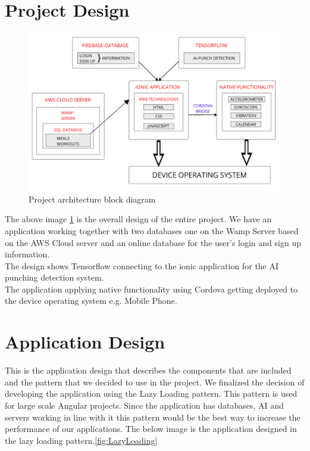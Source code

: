 \documentclass[a4paper,12pt]{report}
\begin{document}
\section{Project Design}
\begin{figure}[h]
\includegraphics[scale=.37]{images/projectOverview.png}
\caption{Project architecture block diagram}
\label{fig:projectDiagram}
\end{figure}

The above image \ref{fig:projectDiagram} is the overall design of the entire project. We have an application working together with two databases one on the Wamp Server based on the AWS Cloud server and an online database for the user's login and sign up information.\\
The design shows Tensorflow connecting to the ionic application for the AI punching detection system.\\
The application applying native functionality using Cordova getting deployed to the device operating system e.g. Mobile Phone. 
\section{Application Design}
This is the application design that describes the components that are included and the pattern that we decided to use in the project.
We finalized the decision of developing the application using the Lazy Loading pattern. This pattern is used for large scale Angular projects.
Since the application has databases, AI and servers working in line with it this pattern would be the best way to increase the performance of our applications.
The below image is the application designed in the lazy loading pattern.\ref{fig:LazyLoading}
\end{document}
